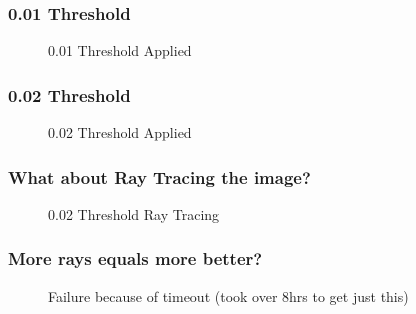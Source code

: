 \documentclass[pdf,8pt]{beamer}
\begin{document}


\begin{frame}
\frametitle{0.01 Threshold}
\begin{figure}[h!]
    \caption{0.01 Threshold Applied}
\end{figure}
\end{frame}
\begin{frame}
\frametitle{0.02 Threshold}
\begin{figure}[h!]
    \caption{0.02 Threshold Applied}
\end{figure}
\end{frame}

\begin{frame}
\frametitle{What about Ray Tracing the image?}
\vspace{-1.4em}
\begin{figure}[h!]
    \caption{0.02 Threshold Ray Tracing}
\end{figure}
\end{frame}
\begin{frame}
\frametitle{More rays equals more better?}
\vspace{-1.4em}
\begin{figure}[h!]
    \caption{Failure because of timeout (took over 8hrs to get just this)}
\end{figure}
\end{frame}
\end{document}
